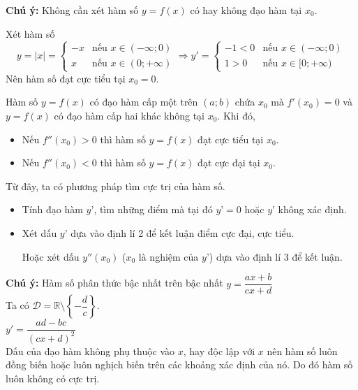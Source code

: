 \textbf{Chú ý:} Không cần xét hàm số $y=f\left( x \right)$ có hay không đạo hàm tại ${x_0}$.

\begin{vd}\normalfont
	Xét hàm số $$y=|x|=\left\{\begin{matrix}
	-x&\text{nếu } x\in (-\infty ;0)\\
	x&\text{nếu } x\in (0;+\infty )
	\end{matrix}\right.
	\Rightarrow
	y'=\left\{\begin{matrix}
	-1<0&\text{nếu } x\in (-\infty ;0)\\
	1>0&\text{nếu } x\in [0;+\infty )
	\end{matrix}\right.$$
	Nên hàm số đạt cực tiểu tại $x_0=0$.
\end{vd}
\begin{dl}Hàm số $y=f(x)$ có đạo hàm cấp một trên $(a;b)$ chứa $x_0$ mà $f'(x_0)=0$ và $y=f(x)$ có đạo hàm cấp hai khác không tại $x_0$. Khi đó,	
	\begin{itemize}
		\item[\checkmark] Nếu $f''\left( x_0 \right)>0$ thì hàm số $y=f\left( x \right)$ đạt cực tiểu tại $x_0$.
		\item[\checkmark] Nếu $f''\left( x_0 \right)<0$ thì hàm số $y=f\left( x \right)$ đạt cực đại tại $x_0$.
	\end{itemize}
\end{dl}
Từ đây, ta có phương pháp tìm cực trị của hàm số.
\begin{itemize}
	\item[\checkmark] Tính đạo hàm $y’$, tìm những điểm mà tại đó $y’=0$ hoặc $y’$ không xác định.
	\item[\checkmark] Xét dấu $y’$ dựa vào định lí 2 để kết luận điểm cực đại, cực tiểu.
	
	Hoặc  xét dấu $y''\left( {x_0} \right)$ (${x_0}$ là nghiệm của $ y’ $) dựa vào định lí 3 để kết luận.
\end{itemize}
\textbf{Chú ý:} Hàm số phân thức bậc nhất trên bậc nhất
$y=\dfrac{ax+b}{cx+d}$\\
Ta có $\mathscr{D}=\mathbb{R} \setminus \left\{-\dfrac{d}{c}\right\}.$\\
$ y'=\dfrac{ad-bc}{{{\left( cx+d \right)}^{2}}}$\\
Dấu của đạo hàm không phụ thuộc vào $x$, hay độc lập với $x$ nên hàm số luôn đồng biến hoặc luôn nghịch biến trên các khoảng xác định của nó. Do đó hàm số luôn không có cực trị.
